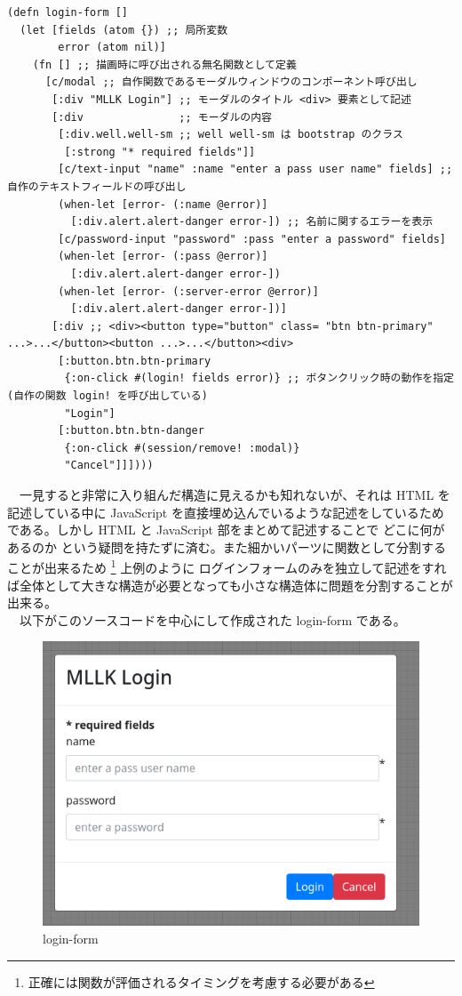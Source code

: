 \documentclass[dvipdfmx]{scrartcl}
\begin{document}
\begin{verbatim}
(defn login-form []
  (let [fields (atom {}) ;; 局所変数
        error (atom nil)] 
    (fn [] ;; 描画時に呼び出される無名関数として定義
      [c/modal ;; 自作関数であるモーダルウィンドウのコンポーネント呼び出し
       [:div "MLLK Login"] ;; モーダルのタイトル <div> 要素として記述
       [:div               ;; モーダルの内容
        [:div.well.well-sm ;; well well-sm は bootstrap のクラス
         [:strong "* required fields"]]
        [c/text-input "name" :name "enter a pass user name" fields] ;; 自作のテキストフィールドの呼び出し
        (when-let [error- (:name @error)]
          [:div.alert.alert-danger error-]) ;; 名前に関するエラーを表示
        [c/password-input "password" :pass "enter a password" fields]
        (when-let [error- (:pass @error)]
          [:div.alert.alert-danger error-])
        (when-let [error- (:server-error @error)]
          [:div.alert.alert-danger error-])]
       [:div ;; <div><button type="button" class= "btn btn-primary" ...>...</button><button ...>...</button><div>
        [:button.btn.btn-primary
         {:on-click #(login! fields error)} ;; ボタンクリック時の動作を指定 (自作の関数 login! を呼び出している)
         "Login"]
        [:button.btn.btn-danger
         {:on-click #(session/remove! :modal)} 
         "Cancel"]]])))
\end{verbatim}

　一見すると非常に入り組んだ構造に見えるかも知れないが、それは HTML を記述している中に JavaScript を直接埋め込んでいるような記述をしているためである。しかし HTML と JavaScript 部をまとめて記述することで どこに何があるのか という疑問を持たずに済む。また細かいパーツに関数として分割することが出来るため \footnote{正確には関数が評価されるタイミングを考慮する必要がある} 上例のように ログインフォームのみを独立して記述をすれば全体として大きな構造が必要となっても小さな構造体に問題を分割することが出来る。\\
　以下がこのソースコードを中心にして作成された login-form である。\\
\begin{figure}[htbp]
\centering
\includegraphics[width=15cm]{./login-view.PNG}
\caption{login-form}
\end{figure}
\end{document}
